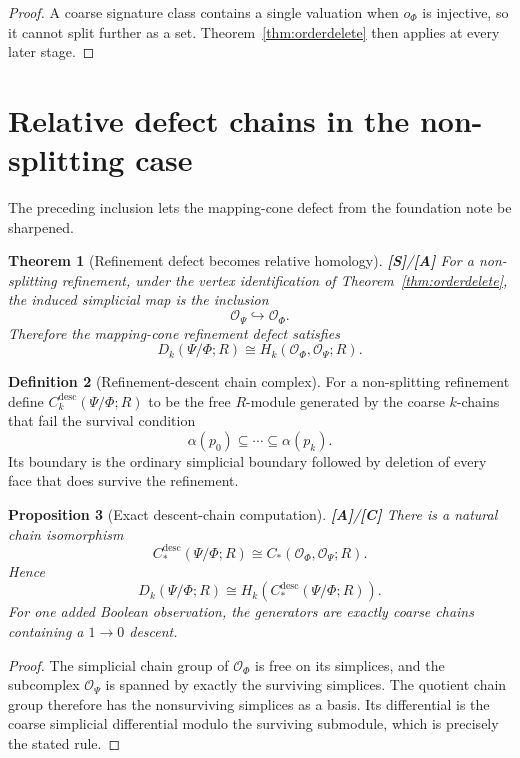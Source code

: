 \documentclass[11pt]{article}
\newtheorem{theorem}{Theorem}[section]
\newtheorem{proposition}[theorem]{Proposition}
\theoremstyle{definition}
\newtheorem{definition}[theorem]{Definition}
\newcommand{\OX}{\mathcal O}
\newcommand{\statusS}{\textbf{[S]}}
\newcommand{\statusA}{\textbf{[A]}}
\newcommand{\statusC}{\textbf{[C]}}
\begin{document}
\begin{proof}
A coarse signature class contains a single valuation when \(o_\Phi\) is injective, so it cannot split further as a set. Theorem~\ref{thm:orderdelete} then applies at every later stage.
\end{proof}

\section{Relative defect chains in the non-splitting case}

The preceding inclusion lets the mapping-cone defect from the foundation note be sharpened.

\begin{theorem}[Refinement defect becomes relative homology]\label{thm:relativecone}
\statusS/\statusA\;
For a non-splitting refinement, under the vertex identification of Theorem~\ref{thm:orderdelete}, the induced simplicial map is the inclusion
\[
\OX_\Psi\hookrightarrow\OX_\Phi.
\]
Therefore the mapping-cone refinement defect satisfies
\[
D_k(\Psi/\Phi;R)
\cong
H_k(\OX_\Phi,\OX_\Psi;R).
\]
\end{theorem}

\begin{definition}[Refinement-descent chain complex]\label{def:descentcomplex}
For a non-splitting refinement define \(C_k^{\mathrm{desc}}(\Psi/\Phi;R)\) to be the free \(R\)-module generated by the coarse \(k\)-chains that fail the survival condition
\[
\alpha(p_0)\subseteq\cdots\subseteq\alpha(p_k).
\]
Its boundary is the ordinary simplicial boundary followed by deletion of every face that does survive the refinement.
\end{definition}

\begin{proposition}[Exact descent-chain computation]\label{prop:descentcomplex}
\statusA/\statusC\;
There is a natural chain isomorphism
\[
C_*^{\mathrm{desc}}(\Psi/\Phi;R)
\cong
C_*(\OX_\Phi,\OX_\Psi;R).
\]
Hence
\[
D_k(\Psi/\Phi;R)
\cong
H_k(C_*^{\mathrm{desc}}(\Psi/\Phi;R)).
\]
For one added Boolean observation, the generators are exactly coarse chains containing a \(1\to0\) descent.
\end{proposition}

\begin{proof}
The simplicial chain group of \(\OX_\Phi\) is free on its simplices, and the subcomplex \(\OX_\Psi\) is spanned by exactly the surviving simplices. The quotient chain group therefore has the nonsurviving simplices as a basis. Its differential is the coarse simplicial differential modulo the surviving submodule, which is precisely the stated rule.
\end{proof}
\end{document}
